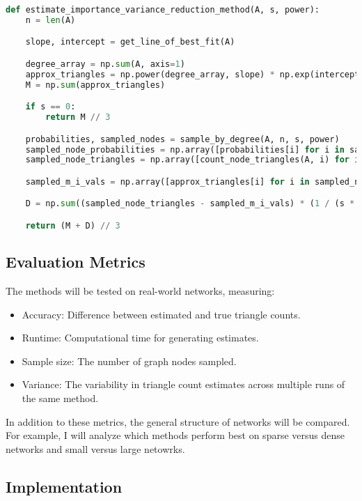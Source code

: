 \documentclass[11pt]{article}
\begin{document}
\begin{lstlisting}[language=Python]
def estimate_importance_variance_reduction_method(A, s, power):
    n = len(A)

    slope, intercept = get_line_of_best_fit(A)

    degree_array = np.sum(A, axis=1)
    approx_triangles = np.power(degree_array, slope) * np.exp(intercept)
    M = np.sum(approx_triangles)

    if s == 0:
        return M // 3

    probabilities, sampled_nodes = sample_by_degree(A, n, s, power)
    sampled_node_probabilities = np.array([probabilities[i] for i in sampled_nodes])
    sampled_node_triangles = np.array([count_node_triangles(A, i) for i in sampled_nodes])

    sampled_m_i_vals = np.array([approx_triangles[i] for i in sampled_nodes])

    D = np.sum((sampled_node_triangles - sampled_m_i_vals) * (1 / (s * sampled_node_probabilities)))

    return (M + D) // 3
\end{lstlisting}

\subsection{Evaluation Metrics}

The methods will be tested on real-world networks, measuring:

\begin{itemize}
    \item Accuracy: Difference between estimated and true triangle counts.
    \item Runtime: Computational time for generating estimates.
    \item Sample size: The number of graph nodes sampled.
    \item Variance: The variability in triangle count estimates across multiple runs of the same method.
\end{itemize}

In addition to these metrics, the general structure of networks will be compared.
For example, I will analyze which methods perform best on sparse versus dense networks and small versus large netowrks.

\subsection{Implementation}
\end{document}
